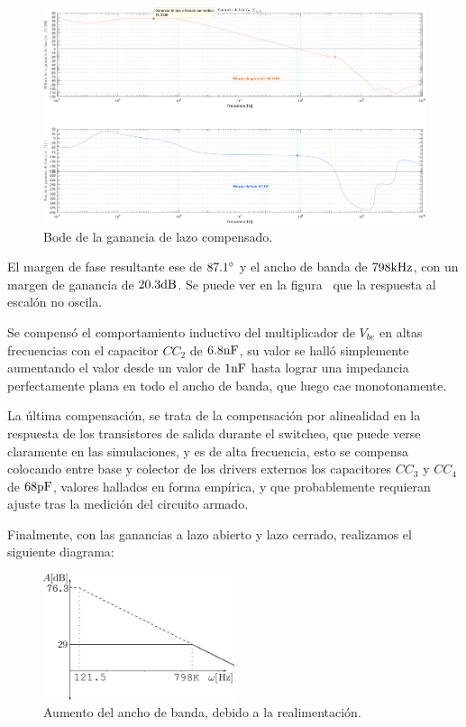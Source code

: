 \clearpage

\begin{figure}[H]
	\centering
	\includegraphics[width=0.85\paperwidth, angle=90]{img/sims/gain_loop_C.png}
	\caption{Bode de la ganancia de lazo compensado.}
	\label{fig:bode-la-con-comp}
\end{figure}

\clearpage


El margen de fase resultante ese de $87.1 \si[per-mode=symbol]{\degree}$ y el ancho de banda de $798 \si[per-mode=symbol]{\kilo\hertz}$, con un margen de ganancia de $20.3 \si[per-mode=symbol]{\decibel}$. Se puede ver en la figura~ que la respuesta al escalón no oscila.

Se compensó el comportamiento inductivo del multiplicador de $V_{be}$ en altas frecuencias con el capacitor $CC_{2}$ de $6.8 \si[per-mode=symbol]{\nano\farad}$, su valor se halló simplemente aumentando el valor desde un valor de $1 \si[per-mode=symbol]{\nano\farad}$ hasta lograr una impedancia perfectamente plana en todo el ancho de banda, que luego cae monotonamente.

La última compensación, se trata de la compensación por alinealidad en la respuesta de los transistores de salida durante el switcheo, que puede verse claramente en las simulaciones, y es de alta frecuencia, esto se compensa colocando entre base y colector de los drivers externos los capacitores $CC_{3}$ y $CC_{4}$ de $68 \si[per-mode=symbol]{\pico\farad}$, valores hallados en forma empírica, y que probablemente requieran ajuste tras la medición del circuito armado.


Finalmente, con las ganancias a lazo abierto y lazo cerrado, realizamos el siguiente diagrama:

\begin{figure}[H]
	\centering
	\includegraphics[width=0.5\textwidth]{img/bodecompensado.png}
	\caption{Aumento del ancho de banda, debido a la realimentación.}
	\label{fig:bode-compensado}
\end{figure}

